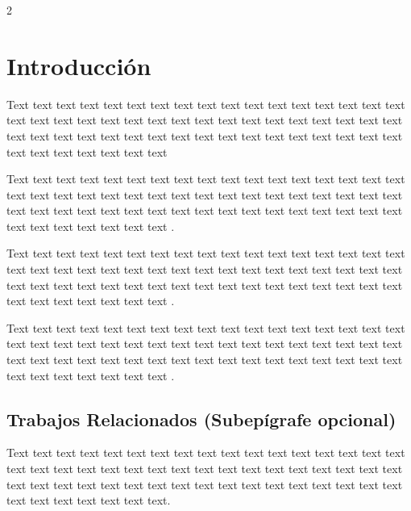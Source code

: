 \documentclass[12pt,twoside]{apa7}
\begin{document}
\newpage
\begin{multicols}{2}

\section {Introducción}
\vspace{-0.15cm}
\setcounter{page}{2}
Text text text text text text text text text text text text text text text text text text text text text text text text text text text text text text text text text text text text text text text text text text text text text text text text text text text text text text text text text text \parencite{Yangari2021}

Text text text text text text text text text text text text text text text text text text text text text text text text text text text text text text text text text text text text text text text text text text text text text text text text text text text text text text text text text text \parencite{Cueva2022}. 

Text text text text text text text text text text text text text text text text text text text text text text text text text text text text text text text text text text text text text text text text text text text text text text text text text text text text text text text text text text \parencite{Cardenas2021}.

Text text text text text text text text text text text text text text text text text text text text text text text text text text text text text text text text text text text text text text text text text text text text text text text text text text text text text text text text text text \parencite{Inga2021}.
\subsection{Trabajos Relacionados (Subepígrafe opcional)}
Text text text text text text text text text text text text text text text text text text text text text text text text text text text text text text text text text text text text text text text text text text text text text text text text text text text text text text text text text text.


\end{multicols}
\end{document}
